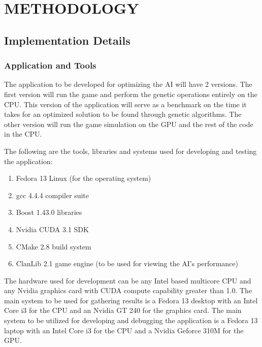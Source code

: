 \chapter{METHODOLOGY}
%
%
\section{Implementation Details}

\subsection{Application and Tools}
The application to be developed for optimizing the AI will have 2 versions.
The first version will run the game and perform the genetic operations entirely
on the CPU. This version of the application will serve as a benchmark on the
time it takes for an optimized solution to be found through genetic algorithms.
The other version will run the game simulation on the GPU and the rest of the
code in the CPU.


The following are the tools, libraries and systems used for developing and testing
the application:

\begin{enumerate}
  \item Fedora 13 Linux (for the operating system)
  \item gcc 4.4.4 compiler suite
  \item Boost 1.43.0 libraries
  \item Nvidia CUDA 3.1 SDK
  \item CMake 2.8 build system
  \item ClanLib 2.1 game engine (to be used for viewing the AI's performance)
\end{enumerate}

The hardware used for development can be any Intel based multicore CPU and any Nvidia
graphics card with CUDA compute capability greater than 1.0. The main system to be
used for gathering results is a Fedora 13 desktop with an Intel Core i3 for
the CPU and an Nvidia GT 240 for the graphics card. The main system to be
utilized for developing and debugging the application is a Fedora 13 laptop with
an Intel Core i3 for the CPU and a Nvidia Geforce 310M for the GPU.


